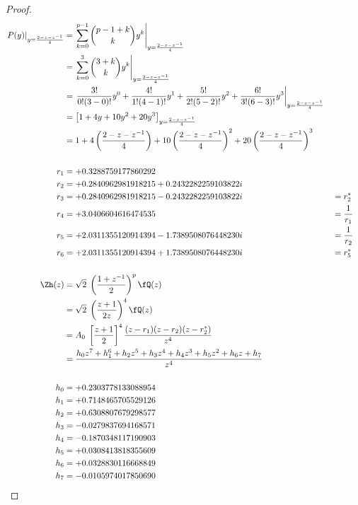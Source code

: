 \begin{proof}
\begin{align*}
  \left.P(y)\right|_{y=\frac{2-z-z^{-1}}{4}}
    &= \left.
       \sum\limits_{k=0}^{p-1} {{p-1+k}\choose{k}} y^k
       \right|_{y=\frac{2-z-z^{-1}}{4}}
  \\&= \left.
       \sum\limits_{k=0}^{3} {{3+k}\choose{k}} y^k
       \right|_{y=\frac{2-z-z^{-1}}{4}}
  \\&= \left.
       \frac{3!}{0!(3-0)!}y^0 + \frac{4!}{1!(4-1)!}y^1 + \frac{5!}{2!(5-2)!}y^2 + \frac{6!}{3!(6-3)!}y^3
       \right|_{y=\frac{2-z-z^{-1}}{4}}
  \\&= \left[1 + 4y + 10y^2 + 20y^3 \right]_{y=\frac{2-z-z^{-1}}{4}}
  \\&= 1
     + 4\left(\frac{2-z-z^{-1}}{4}\right)
     + 10\left(\frac{2-z-z^{-1}}{4}\right)^2
     + 20\left(\frac{2-z-z^{-1}}{4}\right)^3
\\
  \\ r_1 &= +0.3288759177860292
  \\ r_2 &= +0.2840962981918215   +0.2432282259103822 i
  \\ r_3 &= +0.2840962981918215   -0.2432282259103822 i  && = r_2^\ast
  \\ r_4 &= +3.0406604616474535                          && = \frac{1}{r_1}
  \\ r_5 &= +2.0311355120914394  -1.7389508076448230 i   && = \frac{1}{r_2}
  \\ r_6 &= +2.0311355120914394   +1.7389508076448230 i  && = r_5^\ast
\\
\\
  \Zh(z)
    &= \sqrt{2}\; \left(\frac{1+z^{-1}}{2}\right)^p \fQ(z)
  \\&= \sqrt{2}\; \left(\frac{z+1}{2z}\right)^4 \fQ(z)
  \\&= A_0\;      \left[ \frac{z+1}{2} \right]^4 \frac{(z-r_1)(z-r_2)(z-r_2^\ast) }{z^4}
  \\&= \frac{h_0z^7 + h_1^6 + h_2z^5 + h_3z^4 + h_4z^3 + h_5z^2 + h_6z + h_7}
            {z^4}
\\
  \\h_0 &= +0.2303778133088954
  \\h_1 &= +0.7148465705529126
  \\h_2 &= +0.6308807679298577
  \\h_3 &= -0.0279837694168571
  \\h_4 &= -0.1870348117190903
  \\h_5 &= +0.0308413818355609
  \\h_6 &= +0.0328830116668849
  \\h_7 &= -0.0105974017850690
\end{align*}
\end{proof}

